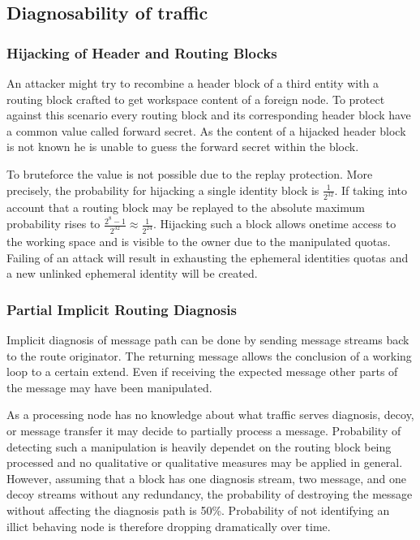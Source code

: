 \subsection{Diagnosability of traffic}

\subsubsection{Hijacking of Header and Routing Blocks}
An attacker might try to recombine a header block of a third entity with a routing block crafted to get workspace content of a foreign node. To protect against this scenario every routing block and its corresponding header block have a common value called forward secret. As the content of a hijacked header block is not known he is unable to guess the forward secret within the block.

To bruteforce the value is not possible due to the replay protection. More precisely, the probability for hijacking a single identity block is $\frac{1}{2^{32}}$. If taking into account that a routing block may be replayed to the absolute maximum probability rises to $\frac{2^8-1}{2^{32}}\approx\frac{1}{2^{24}}$. Hijacking such a block allows onetime access to the working space and is visible to the owner due to the manipulated quotas. Failing of an attack will result in exhausting the ephemeral identities quotas and a new unlinked ephemeral identity will be created. 
 
\subsubsection{Partial Implicit Routing Diagnosis}
Implicit diagnosis of message path can be done by sending message streams back to the route originator. The returning message allows the conclusion of a working loop to a certain extend. Even if receiving the expected message other parts of the message may have been manipulated. 

As a processing node has no knowledge about what traffic serves diagnosis, decoy, or message transfer it may decide to partially process a message. Probability of detecting such a manipulation is heavily dependet on the routing block being processed and no qualitative or qualitative measures may be applied in general. However, assuming that a block has one diagnosis stream, two message, and one decoy streams without any redundancy, the probability of destroying the message without affecting the diagnosis path is 50\%. Probability of not identifying an illict behaving node is therefore dropping dramatically over time.

